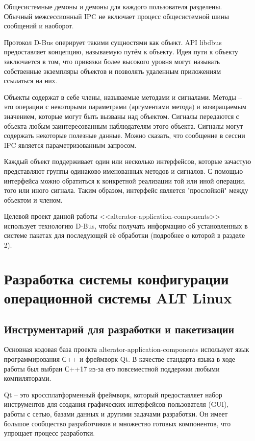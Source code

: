 \documentclass[bachelor, och, pract]{SCWorks}
\begin{document}
Общесистемные демоны и демоны для каждого пользователя разделены.
Обычный межсессионный IPC не включает процесс общесистемной шины сообщений и наоборот.

Протокол D-Bus оперирует такими сущностями как объект.
API libdbus предоставляет концепцию, называемую путём к объекту.
Идея пути к объекту заключается в том, что привязки более высокого уровня могут называть собственные экземпляры объектов и позволять удаленным приложениям ссылаться на них.

Объекты содержат в себе члены, называемые методами и сигналами.
Методы -- это операции с некоторыми параметрами (аргументами метода) и возвращаемым значением, которые могут быть вызваны над объектом.
Сигналы передаются с объекта любым заинтересованным наблюдателям этого объекта.
Сигналы могут содержать некоторые полезные данные. Можно сказать, что сообщение в сессии IPC является параметризованным запросом.

Каждый объект поддерживает один или несколько интерфейсов, которые зачастую представляют группы одинаково именованных методов и сигналов.
С помощью интерфейса можно обратиться к конкретной реализации той или иной операции, того или иного сигнала.
Таким образом, интерфейс является "прослойкой" между объектом и членом\cite{a_dbus}.

Целевой проект данной работы  <<alterator-application-components>> использует технологию D-Bus, чтобы получать информацию об установленных в системе пакетах для последующей её обработки (подробнее о которой в разделе 2).

\newpage

\section{Разработка системы конфигурации операционной системы ALT Linux}

\subsection{Инструментарий для разработки и пакетизации}

Основная кодовая база проекта alterator-application-components использует язык программирования С++ и фреймворк Qt.
В качестве стандарта языка в ходе работы был выбран С++17 из-за его повсеместной поддержки любыми компиляторами.

Qt -- это кроссплатформенный фреймворк, который предоставляет набор инструментов для создания графических интерфейсов пользователя (GUI), работы с сетью, базами данных и другими задачами разработки.
Он имеет большое сообщество разработчиков и множество готовых компонентов, что упрощает процесс разработки.
\end{document}
